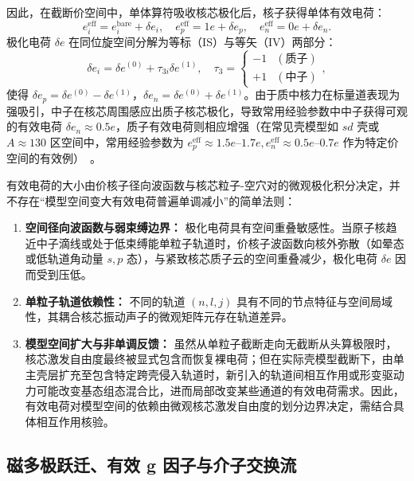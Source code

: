 因此，在截断价空间中，单体算符吸收核芯极化后，核子获得单体有效电荷：
\begin{equation}\label{eq:2-7-eff-charge-def}
e_i^{\mathrm{eff}} = e_i^{\mathrm{bare}} + \delta e_i, \quad e_p^{\mathrm{eff}} = 1e + \delta e_p, \quad e_n^{\mathrm{eff}} = 0e + \delta e_n.
\end{equation}
极化电荷 $\delta e$ 在同位旋空间分解为等标（IS）与等矢（IV）两部分：
\begin{equation}\label{eq:2-7-isospin-pol-charge}
\delta e_i = \delta e^{(0)} + \tau_{3i} \delta e^{(1)}, \quad \tau_3 = \begin{cases} -1 & (\text{质子}) \\ +1 & (\text{中子}) \end{cases},
\end{equation}
使得 $\delta e_p = \delta e^{(0)} - \delta e^{(1)}$，$\delta e_n = \delta e^{(0)} + \delta e^{(1)}$。由于质中核力在标量道表现为强吸引，中子在核芯周围感应出质子核芯极化，导致常用经验参数中中子获得可观的有效电荷 $\delta e_n \approx 0.5e$，质子有效电荷则相应增强（在常见壳模型如 $sd$ 壳或 $A\approx 130$ 区空间中，常用经验参数为 $e_p^{\mathrm{eff}} \approx 1.5e\text{--}1.7e, e_n^{\mathrm{eff}} \approx 0.5e\text{--}0.7e$ 作为特定价空间的有效例）~\cite{book-nuclear-shell-model-70-years}。

有效电荷的大小由价核子径向波函数与核芯粒子-空穴对的微观极化积分决定，并不存在“模型空间变大有效电荷普遍单调减小”的简单法则：
\begin{enumerate}
\item \textbf{空间径向波函数与弱束缚边界：} 极化电荷具有空间重叠敏感性。当原子核趋近中子滴线或处于低束缚能单粒子轨道时，价核子波函数向核外弥散（如晕态或低轨道角动量 $s, p$ 态），与紧致核芯质子云的空间重叠减少，极化电荷 $\delta e$ 因而受到压低。
\item \textbf{单粒子轨道依赖性：} 不同的轨道 $(n, l, j)$ 具有不同的节点特征与空间局域性，其耦合核芯振动声子的微观矩阵元存在轨道差异。
\item \textbf{模型空间扩大与非单调反馈：} 虽然从单粒子截断走向无截断从头算极限时，核芯激发自由度最终被显式包含而恢复裸电荷；但在实际壳模型截断下，由单主壳层扩充至包含特定跨壳侵入轨道时，新引入的轨道间相互作用或形变驱动力可能改变基态组态混合比，进而局部改变某些通道的有效电荷需求。因此，有效电荷对模型空间的依赖由微观核芯激发自由度的划分边界决定，需结合具体相互作用核验。
\end{enumerate}

\subsection{磁多极跃迁、有效 g 因子与介子交换流}\label{sec:2-7-3}

